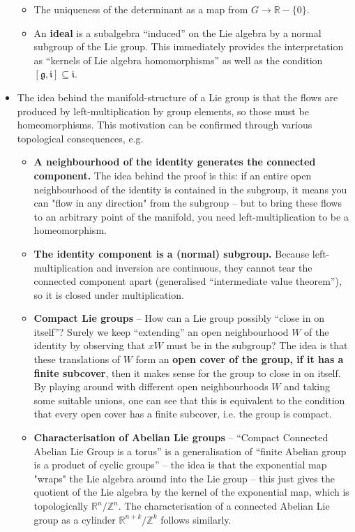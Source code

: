 \documentclass{article}
\begin{document}
\begin{itemize}
     \begin{itemize}
      \item The uniqueness of the determinant as a map from $G\to \mathbb{R}-\{0\}$.
      \item An \textbf{ideal} is a subalgebra ``induced'' on the Lie algebra by a normal subgroup of the Lie group. This immediately provides the interpretation as ``kernels of Lie algebra homomorphisms'' as well as the condition $[\mathfrak{g},\mathfrak{i}]\subseteq\mathfrak{i}$. 
     \end{itemize}
 \item The idea behind the manifold-structure of a Lie group is that the flows are produced by left-multiplication by group elements, so those must be homeomorphisms. This motivation can be confirmed through various topological consequences, e.g.
 \begin{itemize}
  \item \textbf{A neighbourhood of the identity generates the connected component.} The idea behind the proof is this: if an entire open neighbourhood of the identity is contained in the subgroup, it means you can "flow in any direction" from the subgroup -- but to bring these flows to an arbitrary point of the manifold, you need left-multiplication to be a homeomorphism. 
  \item \textbf{The identity component is a (normal) subgroup.} Because left-multiplication and inversion are continuous, they cannot tear the connected component apart (generalised ``intermediate value theorem''), so it is closed under multiplication.
  \item \textbf{Compact Lie groups} -- How can a Lie group possibly ``close in on itself''? Surely we keep ``extending'' an open neighbourhood $W$ of the identity by observing that $xW$ must be in the subgroup? The idea is that these translations of $W$ form an \textbf{open cover of the group, if it has a finite subcover}, then it makes sense for the group to close in on itself. By playing around with different open neighbourhoods $W$ and taking some suitable unions, one can see that this is equivalent to the condition that every open cover has a finite subcover, i.e. the group is compact.
 \item \textbf{Characterisation of Abelian Lie groups} -- ``Compact Connected Abelian Lie Group is a torus'' is a generalisation of ``finite Abelian group is a product of cyclic groups'' -- the idea is that the exponential map "wraps" the Lie algebra around into the Lie group -- this just gives the quotient of the Lie algebra by the kernel of the exponential map, which is topologically $\mathbb{R}^n/\mathbb{Z}^n$. The characterisation of a connected Abelian Lie group as a cylinder $\mathbb{R}^{n+k}/\mathbb{Z}^k$ follows similarly.

\end{itemize}
\end{itemize}
\end{document}
